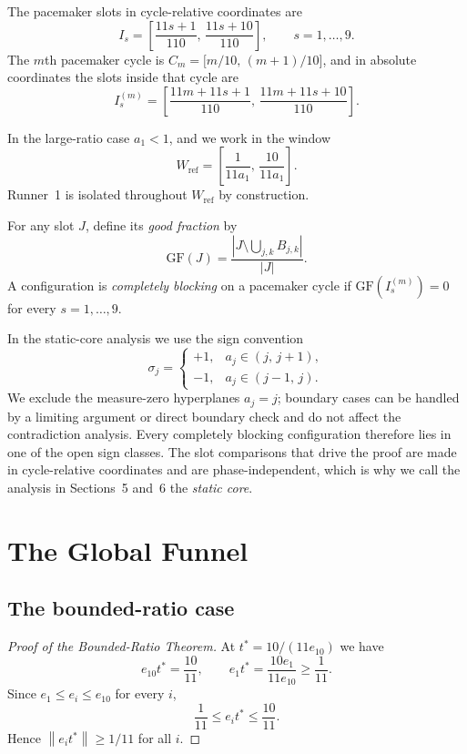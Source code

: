 \documentclass[12pt,a4paper]{amsart}
\theoremstyle{definition}
\theoremstyle{remark}
\newcommand{\GF}{\mathrm{GF}}
\newcommand{\Wref}{W_{\mathrm{ref}}}
\newcommand{\norm}[1]{\left\|#1\right\|}
\begin{document}
The pacemaker slots in cycle-relative coordinates are
\[
  I_s = \left[\frac{11s+1}{110},\,\frac{11s+10}{110}\right],\qquad s=1,\ldots,9.
\]
The $m$th pacemaker cycle is $C_m=\bigl[m/10,\,(m+1)/10\bigr]$, and in absolute coordinates
the slots inside that cycle are
\[
  I_s^{(m)} = \left[\frac{11m+11s+1}{110},\,\frac{11m+11s+10}{110}\right].
\]

In the large-ratio case $a_1<1$, and we work in the window
\[
  \Wref = \left[\frac{1}{11a_1},\,\frac{10}{11a_1}\right].
\]
Runner~1 is isolated throughout $\Wref$ by construction.

For any slot $J$, define its \emph{good fraction} by
\[
  \GF(J) = \frac{|J\setminus\bigcup_{j,k}B_{j,k}|}{|J|}.
\]
A configuration is \emph{completely blocking} on a pacemaker cycle if $\GF(I_s^{(m)})=0$
for every $s=1,\ldots,9$.

In the static-core analysis we use the sign convention
\[
  \sigma_j =
  \begin{cases}
    +1, & a_j\in(j,\,j+1),\\
    -1, & a_j\in(j-1,\,j).
  \end{cases}
\]
We exclude the measure-zero hyperplanes $a_j=j$; boundary cases can be handled by a
limiting argument or direct boundary check and do not affect the contradiction analysis.
Every completely blocking configuration therefore lies in one of the open sign classes.
The slot comparisons that drive the proof are made in cycle-relative coordinates and are
phase-independent, which is why we call the analysis in Sections~5 and~6 the \emph{static core}.

\section{The Global Funnel}

\subsection{The bounded-ratio case}

\begin{proof}[Proof of the Bounded-Ratio Theorem]
At $t^*=10/(11e_{10})$ we have
\[
  e_{10}t^* = \frac{10}{11},\qquad e_1 t^* = \frac{10e_1}{11e_{10}} \ge \frac{1}{11}.
\]
Since $e_1\le e_i\le e_{10}$ for every $i$,
\[
  \frac{1}{11}\le e_i t^*\le \frac{10}{11}.
\]
Hence $\norm{e_i t^*}\ge 1/11$ for all $i$.
\end{proof}
\end{document}

